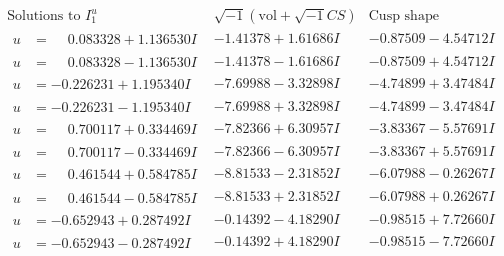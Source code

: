 \documentclass[1p]{elsarticle_modified}
\theoremstyle{definition}
\newcommand{\I}{\sqrt{-1}}
\begin{document}
$$\begin{array}{c|c|c}  
\text{Solutions to }I^u_{1}& \I (\text{vol} + \sqrt{-1}CS) & \text{Cusp shape}\\
 \hline 
\begin{aligned}
u &= \phantom{-}0.083328 + 1.136530 I\end{aligned}
 & -1.41378 + 1.61686 I & -0.87509 - 4.54712 I \\ \hline\begin{aligned}
u &= \phantom{-}0.083328 - 1.136530 I\end{aligned}
 & -1.41378 - 1.61686 I & -0.87509 + 4.54712 I \\ \hline\begin{aligned}
u &= -0.226231 + 1.195340 I\end{aligned}
 & -7.69988 - 3.32898 I & -4.74899 + 3.47484 I \\ \hline\begin{aligned}
u &= -0.226231 - 1.195340 I\end{aligned}
 & -7.69988 + 3.32898 I & -4.74899 - 3.47484 I \\ \hline\begin{aligned}
u &= \phantom{-}0.700117 + 0.334469 I\end{aligned}
 & -7.82366 + 6.30957 I & -3.83367 - 5.57691 I \\ \hline\begin{aligned}
u &= \phantom{-}0.700117 - 0.334469 I\end{aligned}
 & -7.82366 - 6.30957 I & -3.83367 + 5.57691 I \\ \hline\begin{aligned}
u &= \phantom{-}0.461544 + 0.584785 I\end{aligned}
 & -8.81533 - 2.31852 I & -6.07988 - 0.26267 I \\ \hline\begin{aligned}
u &= \phantom{-}0.461544 - 0.584785 I\end{aligned}
 & -8.81533 + 2.31852 I & -6.07988 + 0.26267 I \\ \hline\begin{aligned}
u &= -0.652943 + 0.287492 I\end{aligned}
 & -0.14392 - 4.18290 I & -0.98515 + 7.72660 I \\ \hline\begin{aligned}
u &= -0.652943 - 0.287492 I\end{aligned}
 & -0.14392 + 4.18290 I & -0.98515 - 7.72660 I \\ \hline\begin{aligned}

\end{aligned}
\end{array}$$
\end{document}
